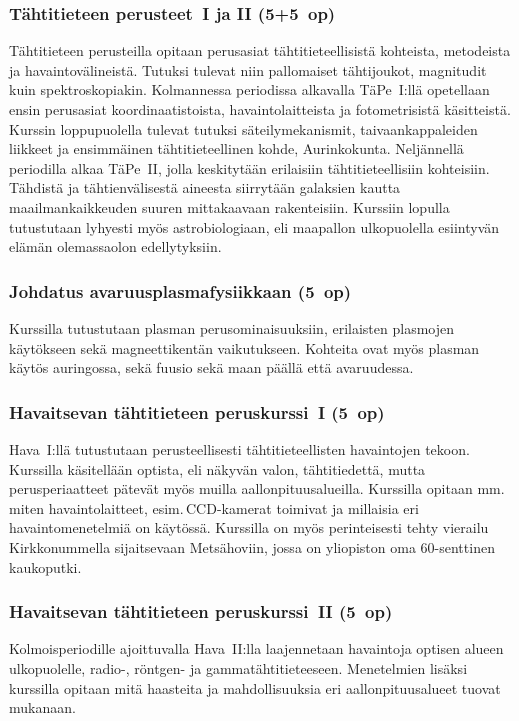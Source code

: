 \documentclass[../ala_hataile.tex]{subfiles}
\begin{document}
\subsubsection*{Tähtitieteen perusteet~I ja II (5+5~op)}
Tähtitieteen perusteilla opitaan perusasiat
tähtitieteellisistä kohteista, metodeista
ja havaintovälineistä. Tutuksi tulevat niin
pallomaiset tähtijoukot, magnitudit kuin
spektroskopiakin. Kolmannessa periodissa
alkavalla TäPe~I:llä opetellaan ensin
perusasiat koordinaatistoista, havaintolaitteista
ja fotometrisistä käsitteistä. Kurssin
loppupuolella tulevat tutuksi säteilymekanismit,
taivaankappaleiden liikkeet ja ensimmäinen
tähtitieteellinen kohde, Aurinkokunta.
Neljännellä periodilla alkaa TäPe~II, jolla
keskitytään erilaisiin tähtitieteellisiin kohteisiin.
Tähdistä ja tähtienvälisestä aineesta
siirrytään galaksien kautta maailmankaikkeuden
suuren mittakaavaan rakenteisiin.
Kurssiin lopulla tutustutaan lyhyesti myös
astrobiologiaan, eli maapallon ulkopuolella
esiintyvän elämän olemassaolon edellytyksiin.

\subsubsection*{Johdatus avaruusplasmafysiikkaan (5~op)}
Kurssilla tutustutaan plasman perusominaisuuksiin, 
erilaisten plasmojen käytökseen sekä magneettikentän 
vaikutukseen. Kohteita ovat myös plasman käytös auringossa, 
sekä fuusio sekä maan päällä että avaruudessa. 

\subsubsection*{Havaitsevan tähtitieteen peruskurssi~I (5~op)}
Hava~I:llä tutustutaan perusteellisesti
tähtitieteellisten havaintojen tekoon. Kurssilla
käsitellään optista, eli näkyvän valon,
tähtitiedettä, mutta perusperiaatteet pätevät
myös muilla aallonpituusalueilla. Kurssilla
opitaan mm.\,miten havaintolaitteet, esim.\,CCD-kamerat toimivat ja millaisia eri havaintomenetelmiä
on käytössä. Kurssilla
on myös perinteisesti tehty vierailu Kirkkonummella
sijaitsevaan Metsähoviin, jossa
on yliopiston oma 60-senttinen kaukoputki.
\subsubsection*{Havaitsevan tähtitieteen peruskurssi~II (5~op)}
Kolmoisperiodille ajoittuvalla
Hava~II:lla laajennetaan havaintoja optisen
alueen ulkopuolelle, radio-, röntgen- ja
gammatähtitieteeseen. Menetelmien lisäksi
kurssilla opitaan mitä haasteita ja mahdollisuuksia
eri aallonpituusalueet tuovat mukanaan. 
\end{document}
